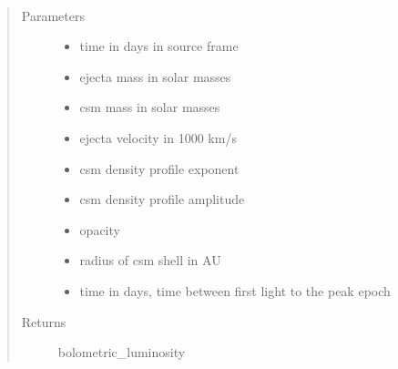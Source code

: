 \documentclass[letterpaper,10pt,english]{sphinxmanual}
\begin{document}
\begin{fulllineitems}
\label{\detokenize{generated/sdapy.models.csm.csm_interaction_bolometric:sdapy.models.csm.csm_interaction_bolometric}}~\begin{quote}\begin{description}
\item[{Parameters}] \leavevmode\begin{itemize}
\item {} 
 \textendash{} time in days in source frame

\item {} 
 \textendash{} ejecta mass in solar masses

\item {} 
 \textendash{} csm mass in solar masses

\item {} 
 \textendash{} ejecta velocity in 1000 km/s

\item {} 
 \textendash{} csm density profile exponent

\item {} 
 \textendash{} csm density profile amplitude

\item {} 
 \textendash{} opacity

\item {} 
 \textendash{} radius of csm shell in AU

\item {} 
 \textendash{} time in days, time between first light to the peak epoch

\end{itemize}

\item[{Returns}] \leavevmode
bolometric\_luminosity

\end{description}\end{quote}

\end{fulllineitems}
\end{document}
